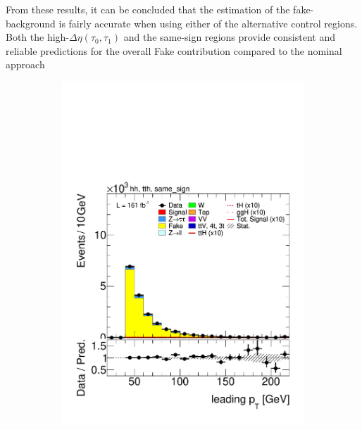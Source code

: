 From these results, it can be concluded that the estimation of the fake-\tauhad background is fairly accurate when using either of the alternative control regions. Both the high-$\Delta\eta(\tau_0,\tau_1)$ and the same-sign regions provide consistent and reliable predictions for the overall Fake contribution compared to the nominal approach
\begin{figure}[htbp]
  \centering
  \begin{subfigure}[b]{0.45\textwidth}
    \centering
    \includegraphics[width=\textwidth]{images/same_sign_same_sign_run3/plot_tau_0_pt_hh_tth_22_23_24_same_sign.pdf}
    \caption{}
  \end{subfigure}
  \hfill
  \begin{subfigure}[b]{0.45\textwidth}
    \centering

\end{subfigure}
\end{figure}
